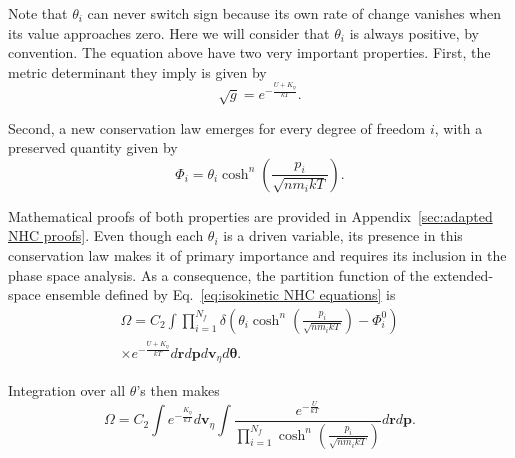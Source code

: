 \documentclass[
aip,
jcp,
reprint,
]{revtex4-1}
\newcommand{\vt}[1]{\boldsymbol{\mathbf{#1}}}          %
\begin{document}
Note that $\theta_i$ can never switch sign because its own rate of change vanishes when its value approaches zero.
Here we will consider that $\theta_i$ is always positive, by convention.
The equation above have two very important properties.
First, the metric determinant they imply is given by
\begin{equation}
\label{eq:isokinetic NHC metric determinant}
\sqrt{g} = e^{-\frac{U + K_\eta}{kT}}.
\end{equation}

Second, a new conservation law emerges for every degree of freedom $i$, with a preserved quantity given by
\begin{equation}
\label{eq:isokinetic NHC conserved quantity}
\Phi_i = \theta_i \cosh^n\left(\frac{p_i}{\sqrt{n m_i k T}}\right).
\end{equation}

Mathematical proofs of both properties are provided in Appendix~\ref{sec:adapted NHC proofs}.
Even though each $\theta_i$ is a driven variable, its presence in this conservation law makes it of primary importance \cite{Tuckerman_2001} and requires its inclusion in the phase space analysis.
As a consequence, the partition function of the extended-space ensemble defined by Eq.~\eqref{eq:isokinetic NHC equations} is
\begin{multline*}
\label{eq:isokinetic NHC defined partition function}
\Omega = C_2 \int \prod_{i=1}^{N_f}\delta\left(\theta_i \cosh^n\left(\tfrac{p_i}{\sqrt{n m_i k T}}\right) - \Phi_i^0\right) \\
\times  e^{-\frac{U + K_\eta}{kT}} d{\vt r} d{\vt p} d{\vt v}_\eta d{\vt \theta}.
\end{multline*}

Integration over all $\theta$'s then makes
\begin{equation*}
\label{eq:isokinetic NHC partition function}
\Omega = C_2 \int e^{-\frac{K_\eta}{kT}} d{\vt v}_\eta \int \frac{e^{-\frac{U}{kT}}}{\prod_{i=1}^{N_f} \cosh^n\left(\tfrac{p_i}{\sqrt{n m_i k T}}\right)} d{\vt r} d{\vt p}.
\end{equation*}
\end{document}

